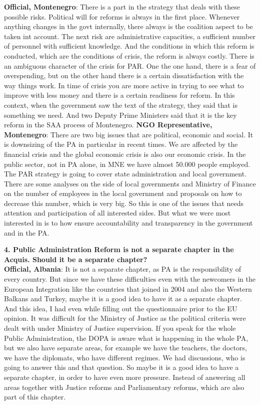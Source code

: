 \textbf{Official, Montenegro}: There is a part in the strategy that deals with these possible risks. Political will for reforms is always in the first place. Whenever anything changes in the govt internally, there always is the coalition aspect to be taken int account. The next risk are administrative capacities, a sufficient number of personnel with sufficient knowledge. And the conditions in which this reform is conducted, which are the conditions of crisis, the reform is always costly. There is an ambiguous character of the crisis for PAR. One the one hand, there is a fear of overspending, but on the other hand there is a certain dissatisfaction with the way things work. In time of crisis you are more active in trying to see what to improve with less money and there is a certain readiness for reform. In this context, when the government saw the text of the strategy, they said that is something we need. And two Deputy Prime Ministers said that it is the key reform in the SAA process of Montenegro.
\textbf{NGO Representative, Montenegro}: There are two big issues that are political, economic and social. It is downsizing of the PA in particular in recent times. We are affected by the financial crisis and the global economic crisis is also our economic crisis. In the public sector, not in PA alone, in MNE we have almost 50.000 people employed. The PAR strategy is going to cover state administration and local government. There are some analyses on the side of local governments and Ministry of Finance on the number of employees in the local government and proposals on how to decrease this number, which is very big. So this is one of the issues that needs attention and participation of all interested sides. But what we were most interested in is to how ensure accountability and transparency in the government and in the PA.\newpage
\textbf{4. Public Administration Reform is not a separate chapter in the Acquis. Should it be a separate chapter?}\\
\textbf{Official, Albania}: It is not a separate chapter, as PA is the responsibility of every country. But since we have these difficulties even with the newcomers in the European Integration like the countries that joined in 2004 and also the Western Balkans and Turkey, maybe it is a good idea to have it as a separate chapter. And this idea, I had even while filling out the questionnaire prior to the EU opinion. It was difficult for the Ministry of Justice as the political criteria were dealt with under Ministry of Justice supervision. If you speak for the whole Public Administration, the DOPA is aware what is happening in the whole PA, but we also have separate areas, for example we have the teachers, the doctors, we have the diplomats, who have different regimes. We had discussions, who is going to answer this and that question. So maybe it is a good idea to have a separate chapter, in order to have even more pressure. Instead of answering all areas together with Justice reforms and Parliamentary reforms, which are also part of this chapter.
